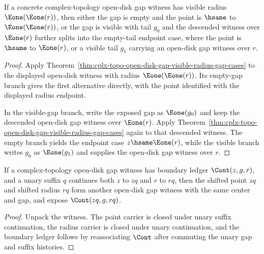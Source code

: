 \begin{theorem}
\label{thm:cplx-topo-open-disk-gap-two-visible-radius-descent}
If a concrete complex-topology open-disk gap witness has visible radius
$\Eone(\Eone(r))$, then either the gap is empty and the point is
$\hsame$ to $\Eone(\Eone(r))$, or the gap is visible with tail $g_0$ and
the descended witness over $\Eone(r)$ further splits into the empty-tail
endpoint case, where the point is $\hsame$ to $\Eone(r)$, or a visible
tail $g_1$ carrying an open-disk gap witness over $r$.
\end{theorem}
\begin{proof}
Apply Theorem~\ref{thm:cplx-topo-open-disk-gap-visible-radius-gap-cases}
to the displayed open-disk witness with radius $\Eone(\Eone(r))$. Its
empty-gap branch gives the first alternative directly, with the point
identified with the displayed radius endpoint.

In the visible-gap branch, write the exposed gap as $\Eone(g_0)$ and keep
the descended open-disk gap witness over $\Eone(r)$. Apply
Theorem~\ref{thm:cplx-topo-open-disk-gap-visible-radius-gap-cases} again
to that descended witness. The empty branch yields the endpoint case
$z\hsame\Eone(r)$, while the visible branch writes $g_0$ as $\Eone(g_1)$
and supplies the open-disk gap witness over $r$.
\end{proof}

\begin{theorem}
\label{thm:cplx-topo-open-disk-gap-unary-suffix-transport}
If a complex-topology open-disk gap witness has boundary ledger
\(\Cont(z,g,r)\), and a unary suffix \(q\) continues both \(z\) to \(zq\)
and \(r\) to \(rq\), then the shifted point \(zq\) and shifted radius \(rq\)
form another open-disk gap witness with the same center and gap, and expose
\(\Cont(zq,g,rq)\).
\end{theorem}
\begin{proof}
Unpack the witness. The point carrier is closed under unary suffix
continuation, the radius carrier is closed under unary continuation, and the
boundary ledger follows by reassociating \(\Cont\) after commuting the unary
gap and suffix histories.
\end{proof}

